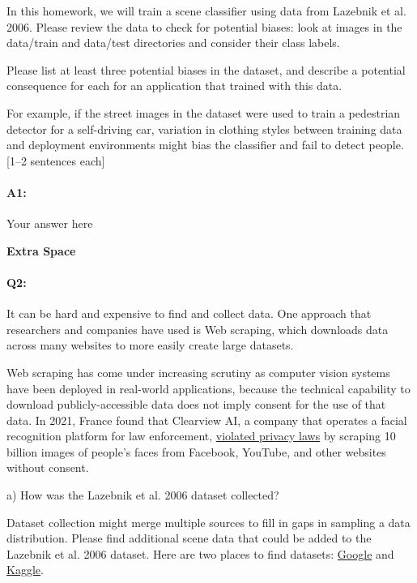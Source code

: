 In this homework, we will train a scene classifier using data from Lazebnik et al. 2006. Please review the data to check for potential biases: look at images in the data/train and data/test directories and consider their class labels. 

Please list at least three potential biases in the dataset, and describe a potential consequence for each for an application that trained with this data.

For example, if the street images in the dataset were used to train a pedestrian detector for a self-driving car, variation in clothing styles between training data and deployment environments might bias the classifier and fail to detect people. [1--2 sentences each]

\paragraph{A1:} Your answer here

\pagebreak

\textbf{Extra Space}

\pagebreak
 
\paragraph{Q2:}  It can be hard and expensive to find and collect data. One approach that researchers and companies have used is Web scraping, which downloads data across many websites to more easily create large datasets.

Web scraping has come under increasing scrutiny as computer vision systems have been deployed in real-world applications, because the technical capability to download publicly-accessible data does not imply consent for the use of that data. In 2021, France found that Clearview AI, a company that operates a facial recognition platform for law enforcement, \href{https://techcrunch.com/2021/12/16/clearview-gdpr-breaches-france/}{violated privacy laws} by scraping 10 billion images of people's faces from Facebook, YouTube, and other websites without consent.

a) How was the Lazebnik et al. 2006 dataset collected?

Dataset collection might merge multiple sources to fill in gaps in sampling a data distribution. Please find additional scene data that could be added to the Lazebnik et al. 2006 dataset. Here are two places to find datasets: \href{https://datasetsearch.research.google.com}{Google} and \href{https://www.kaggle.com}{Kaggle}. 

